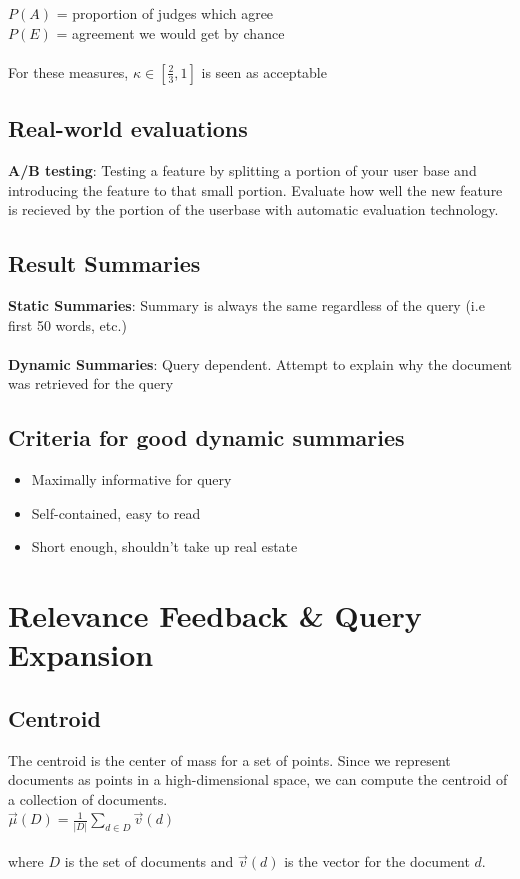 \documentclass{article}%
\begin{document}
$P(A)$ = proportion of judges which agree \\

$P(E)$ = agreement we would get by chance\\
\\
For these measures, $\kappa \in [\frac{2}{3}, 1]$ is seen as acceptable
\subsection*{Real-world evaluations}
\textbf{A/B testing}: Testing a feature by splitting a portion of your user base and introducing the
feature to that small portion. Evaluate how well the new feature is recieved by the portion of the
userbase with automatic evaluation technology.
\subsection*{Result Summaries}
\textbf{Static Summaries}: Summary is always the same regardless of the query (i.e first 50 words, etc.) \\
\\
\textbf{Dynamic Summaries}: Query dependent. Attempt to explain why the document was retrieved for the query
\subsection*{Criteria for good dynamic summaries}
\begin{itemize}
    \item Maximally informative for query
    \item Self-contained, easy to read
    \item Short enough, shouldn't take up real estate
\end{itemize}
\section*{Relevance Feedback \& Query Expansion}
\subsection*{Centroid}
The centroid is the center of mass for a set of points. Since we represent documents as points in a
high-dimensional space, we can compute the centroid of a collection of documents.\\

$\vec{\mu}(D) = \frac{1}{|D|} \sum\limits_{d \in D}\vec{v}(d)$\\
\\
where $D$ is the set of documents and $\vec{v}(d)$ is the vector for the document $d$.
\end{document}
